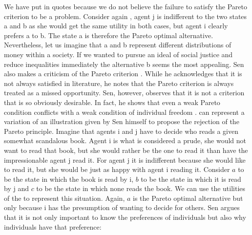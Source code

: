 We have put  in quotes because we do not believe the failure to satisfy the Pareto criterion to be a problem.
Consider again , agent j is indifferent to the two states a and b as she would get the same utility in both cases, but agent i clearly prefers a to b. The state a is therefore the Pareto optimal alternative. Nevertheless, let us imagine that a and b represent different distributions of money within a society. If we wanted to pursue an ideal of social justice and reduce inequalities immediately the alternative b seems the most appealing.
Sen also makes a criticism of the Pareto criterion \cite[Chapter 6]{Sen2017}. While he acknowledges that it is not always satisfied in literature, he notes that the Pareto criterion is always treated as a missed opportunity. Sen, however, observes that it is not a criterion that is so obviously desirable. In fact, he shows that even a weak Pareto condition conflicts with a weak condition of individual freedom \cite[Theorem 6*3]{Sen2017}.
 can represent a variation of an illustration given by Sen himself to propose the rejection of the Pareto principle. Imagine that agents i and j have to decide who reads a given somewhat scandalous book. Agent i is what is considered a prude, she would not want to read that book, but she would rather be the one to read it than have the impressionable agent j read it. For agent j it is indifferent because she would like to read it, but she would be just as happy with agent i reading it. Consider $a$ to be the state in which the book is read by i, $b$ to be the state in which it is read by j and $c$ to be the state in which none reads the book. We can use the utilities of the  to represent this situation.
Again, $a$ is the Pareto optimal alternative but only because i has the presumption of wanting to decide for others. Sen argues that it is not only important to know the preferences of individuals but also why individuals have that preference:
 \cite[Chapter 6.5]{Sen2017}

